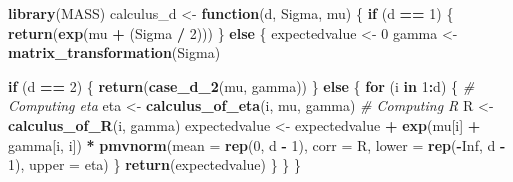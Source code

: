 \documentclass[
]{article}
\newenvironment{Shaded}{\begin{snugshade}}{\end{snugshade}}
\newcommand{\AttributeTok}[1]{\textcolor[rgb]{0.13,0.29,0.53}{#1}}
\newcommand{\CommentTok}[1]{\textcolor[rgb]{0.56,0.35,0.01}{\textit{#1}}}
\newcommand{\ConstantTok}[1]{\textcolor[rgb]{0.56,0.35,0.01}{#1}}
\newcommand{\ControlFlowTok}[1]{\textcolor[rgb]{0.13,0.29,0.53}{\textbf{#1}}}
\newcommand{\DecValTok}[1]{\textcolor[rgb]{0.00,0.00,0.81}{#1}}
\newcommand{\FunctionTok}[1]{\textcolor[rgb]{0.13,0.29,0.53}{\textbf{#1}}}
\newcommand{\NormalTok}[1]{#1}
\newcommand{\OtherTok}[1]{\textcolor[rgb]{0.56,0.35,0.01}{#1}}
\newcommand{\SpecialCharTok}[1]{\textcolor[rgb]{0.81,0.36,0.00}{\textbf{#1}}}
\begin{document}
\begin{Shaded}
\begin{Highlighting}[]
\FunctionTok{library}\NormalTok{(MASS)}
\NormalTok{calculus\_d }\OtherTok{\textless{}{-}} \ControlFlowTok{function}\NormalTok{(d, Sigma, mu) \{}
  \ControlFlowTok{if}\NormalTok{ (d }\SpecialCharTok{==} \DecValTok{1}\NormalTok{) \{}
    \FunctionTok{return}\NormalTok{(}\FunctionTok{exp}\NormalTok{(mu }\SpecialCharTok{+}\NormalTok{ (Sigma }\SpecialCharTok{/} \DecValTok{2}\NormalTok{)))}
\NormalTok{  \} }\ControlFlowTok{else}\NormalTok{ \{}
\NormalTok{    expectedvalue }\OtherTok{\textless{}{-}} \DecValTok{0}
\NormalTok{    gamma }\OtherTok{\textless{}{-}} \FunctionTok{matrix\_transformation}\NormalTok{(Sigma)}

    \ControlFlowTok{if}\NormalTok{ (d }\SpecialCharTok{==} \DecValTok{2}\NormalTok{) \{}
      \FunctionTok{return}\NormalTok{(}\FunctionTok{case\_d\_2}\NormalTok{(mu, gamma))}
\NormalTok{    \} }\ControlFlowTok{else}\NormalTok{ \{}
      \ControlFlowTok{for}\NormalTok{ (i }\ControlFlowTok{in} \DecValTok{1}\SpecialCharTok{:}\NormalTok{d)}
\NormalTok{      \{}
        \CommentTok{\# Computing eta}
\NormalTok{        eta }\OtherTok{\textless{}{-}} \FunctionTok{calculus\_of\_eta}\NormalTok{(i, mu, gamma)}
        \CommentTok{\# Computing R}
\NormalTok{        R }\OtherTok{\textless{}{-}} \FunctionTok{calculus\_of\_R}\NormalTok{(i, gamma)}
\NormalTok{        expectedvalue }\OtherTok{\textless{}{-}}\NormalTok{ expectedvalue }\SpecialCharTok{+} \FunctionTok{exp}\NormalTok{(mu[i] }\SpecialCharTok{+}\NormalTok{ gamma[i, i]) }\SpecialCharTok{*} \FunctionTok{pmvnorm}\NormalTok{(}\AttributeTok{mean =} \FunctionTok{rep}\NormalTok{(}\DecValTok{0}\NormalTok{, d }\SpecialCharTok{{-}} \DecValTok{1}\NormalTok{), }\AttributeTok{corr =}\NormalTok{ R, }\AttributeTok{lower =} \FunctionTok{rep}\NormalTok{(}\SpecialCharTok{{-}}\ConstantTok{Inf}\NormalTok{, d }\SpecialCharTok{{-}} \DecValTok{1}\NormalTok{), }\AttributeTok{upper =}\NormalTok{ eta)}
\NormalTok{      \}}
      \FunctionTok{return}\NormalTok{(expectedvalue)}
\NormalTok{    \}}
\NormalTok{  \}}
\NormalTok{\}}
\end{Highlighting}
\end{Shaded}
\end{document}
